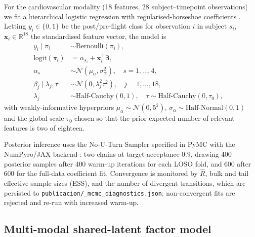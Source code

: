 \documentclass[11pt,a4paper,3p,authoryear]{elsarticle}
\begin{document}
For the cardiovascular modality (18 features, 28 subject--timepoint observations) we fit a hierarchical logistic regression with regularised-horseshoe coefficients \citep{Carvalho2010horseshoe,Piironen2017regularised}. Letting $y_i \in \{0,1\}$ be the post/pre-flight class for observation $i$ in subject $s_i$, $\mathbf{x}_i \in \mathbb{R}^{18}$ the standardised feature vector, the model is
\begin{align}
y_i \mid \pi_i &\sim \mathrm{Bernoulli}(\pi_i), \\
\mathrm{logit}(\pi_i) &= \alpha_{s_i} + \mathbf{x}_i^\top \boldsymbol{\beta}, \label{eq:logit} \\
\alpha_s &\sim \mathcal{N}(\mu_\alpha, \sigma_\alpha^2),\quad s = 1,\dots,4, \\
\beta_j \mid \lambda_j, \tau &\sim \mathcal{N}(0, \lambda_j^2 \tau^2),\quad j = 1,\dots,18, \\
\lambda_j &\sim \mathrm{Half\text{-}Cauchy}(0, 1),\quad \tau \sim \mathrm{Half\text{-}Cauchy}(0, \tau_0),
\end{align}
with weakly-informative hyperpriors $\mu_\alpha \sim \mathcal{N}(0, 5^2)$, $\sigma_\alpha \sim \mathrm{Half\text{-}Normal}(0, 1)$ and the global scale $\tau_0$ chosen so that the prior expected number of relevant features is two of eighteen.

Posterior inference uses the No-U-Turn Sampler \citep{Hoffman2014nuts} specified in PyMC \citep{Salvatier2016pymc} with the NumPyro/JAX backend \citep{Phan2019numpyro}: two chains at target acceptance $0.9$, drawing 400 posterior samples after 400 warm-up iterations for each LOSO fold, and 600 after 600 for the full-data coefficient fit. Convergence is monitored by $\hat{R}$, bulk and tail effective sample sizes (ESS), and the number of divergent transitions, which are persisted to \texttt{publicacion/\_mcmc\_diagnostics.json}; non-convergent fits are rejected and re-run with increased warm-up.

\subsection{Multi-modal shared-latent factor model}\label{sec:methods-factor}
\end{document}
